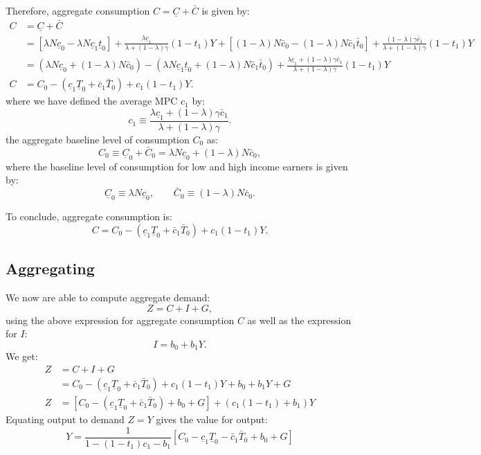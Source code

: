 \documentclass[]{book}
\theoremstyle{definition}
\theoremstyle{definition}
\theoremstyle{definition}
\theoremstyle{remark}
\begin{document}
Therefore, aggregate consumption \(C=\underline{C} + \bar{C}\) is given
by: \[
\begin{aligned}
C&=\underline{C} + \bar{C}\\
&=\left[\lambda N  \underline{c}_{0}-\lambda  N \underline{c}_{1} \underline{t}_0 \right]+ \frac{\lambda \underline{c}_{1}}{\lambda+(1-\lambda)\gamma}(1-t_1)Y + 
\left[(1-\lambda)  N \bar{c}_{0}-(1-\lambda) N  \bar{c}_{1} \bar{t}_0\right] + 
\frac{(1-\lambda) \gamma\bar{c}_{1}}{\lambda+(1-\lambda)\gamma}(1-t_1)Y\\
&=\left(\lambda N  \underline{c}_{0}+(1-\lambda) N  \bar{c}_{0}\right)-\left(\lambda  N \underline{c}_{1} \underline{t}_0 +(1-\lambda) N  \bar{c}_{1} \bar{t}_0\right) +\frac{\lambda\underline{c}_{1}+\left(1-\lambda\right)\gamma\bar{c}_{1}}{\lambda+(1-\lambda)\gamma}(1-t_1)Y\\
C&=C_0 -\left(\underline{c}_{1}\underline{T}_0+\bar{c}_{1}\bar{T}_0\right)+c_1 (1-t_1) Y.
\end{aligned}
\] where we have defined the average MPC \(c_1\) by:
\[c_{1}\equiv\frac{\lambda\underline{c}_{1}+\left(1-\lambda\right)\gamma\bar{c}_{1}}{\lambda+(1-\lambda)\gamma}.\]
the aggregate baseline level of consumption \(C_0\) as:
\[C_{0} \equiv \underline{C}_0 +  \bar{C}_0 = \lambda  N \underline{c}_0 + (1-\lambda) N \bar{c}_0,\]
where the baseline level of consumption for low and high income earners
is given by:
\[\underline{C}_0\equiv \lambda  N \underline{c}_0, \qquad \bar{C}_0\equiv (1-\lambda) N \bar{c}_0.\]

To conclude, aggregate consumption is:
\[\boxed{C = C_0 -\left(\underline{c}_{1}\underline{T}_0+\bar{c}_{1}\bar{T}_0\right)+c_1 (1-t_1) Y}.\]

\subsection{Aggregating}\label{aggregating}

We now are able to compute aggregate demand: \[Z=C+I+G,\] using the
above expression for aggregate consumption \(C\) as well as the
expression for \(I\): \[I=b_0 +b_1 Y.\] We get: \[
\begin{aligned}
Z   &=C+I+G\\
    &=C_0 -\left(\underline{c}_{1}\underline{T}_0+\bar{c}_{1}\bar{T}_0\right)+c_1 (1-t_1) Y + b_{0}+b_{1}Y+G\\
Z   &=\left[C_0 -\left(\underline{c}_{1}\underline{T}_0+\bar{c}_{1}\bar{T}_0\right)+ b_{0} + G \right]+ \left(c_1(1-t_1) + b_1\right) Y 
\end{aligned}
\] Equating output to demand \(Z = Y\) gives the value for output:
\[\boxed{Y=\frac{1}{1-\left(1-t_{1}\right)c_{1}-b_{1}}\left[C_0-\underline{c}_{1}\underline{T}_{0}-\bar{c}_{1}\bar{T}_{0}+b_{0}+G\right]}\]
\end{document}
